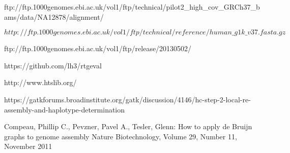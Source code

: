 


\renewcommand{\bibname}{References}

% 


\begin{thebibliography}{99}

 ftp://ftp.1000genomes.ebi.ac.uk/vol1/ftp/technical/pilot2\_high\_cov\_GRCh37\_bams/data/NA12878/alignment/

$http://ftp.1000genomes.ebi.ac.uk/vol1/ftp/technical/reference/human\_g1k\_v37.fasta.gz$

ftp://ftp.1000genomes.ebi.ac.uk/vol1/ftp/release/20130502/

https://github.com/lh3/rtgeval

http://www.htslib.org/

https://gatkforums.broadinstitute.org/gatk/discussion/4146/hc-step-2-local-re-assembly-and-haplotype-determination

Compeau, Phillip C., Pevzner, Pavel A., Tesler, Glenn:
How to apply de Bruijn graphs to genome assembly
Nature Biotechnology, Volume 29, Number 11, November 2011

\end{thebibliography}
